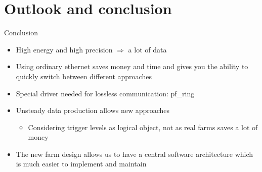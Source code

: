\section{Outlook and conclusion}

\begin{frame}{Conclusion}{}
	\begin{itemize}
		\item High energy and high precision $\Rightarrow$ a lot of data
		\vspace{2mm}
		\item Using ordinary ethernet saves money and time and gives you the ability
			to quickly switch between different approaches
		\vspace{2mm}
		\item Special driver needed for lossless communication: pf\_ring
		\vspace{2mm}
		\item Unsteady data production allows new approaches
		 	 \begin{itemize}
			  \item Considering trigger levels as logical object, not as real farms saves
			  a lot of money
			\end{itemize}
		\vspace{2mm}
		\item The new farm design allows us to have a central software
		architecture which is much easier to implement and maintain
	\end{itemize}
\end{frame}